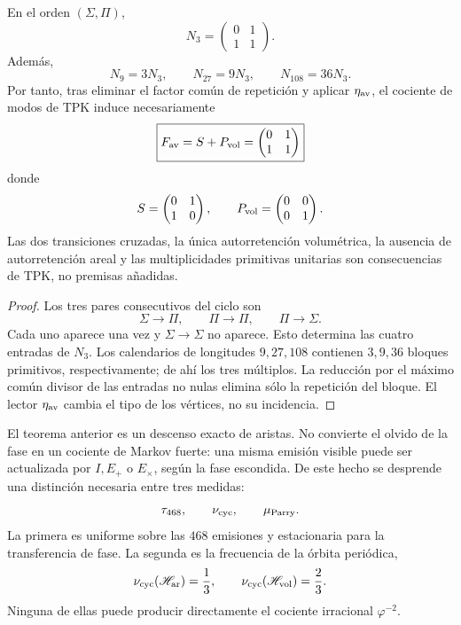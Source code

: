 \begin{theorem}
\label{p12-83-c16-s3:thm:descenso-necesario-fav-corta}
En el orden \((\Sigma,\Pi)\),
\[
 N_3=
 \begin{pmatrix}0&1\\1&1\end{pmatrix}.
\]
Además,
\[
 N_9=3N_3,\qquad
 N_{27}=9N_3,\qquad
 N_{108}=36N_3.
\]
Por tanto, tras eliminar el factor común de repetición y aplicar
\(\eta_{\rm av}\), el cociente de modos de TPK induce necesariamente
\[
 \boxed{
 F_{\rm av}=S+P_{\rm vol}
 =
 \begin{pmatrix}0&1\\1&1\end{pmatrix}
 }
\]
donde
\[
 S=\begin{pmatrix}0&1\\1&0\end{pmatrix},
 \qquad
 P_{\rm vol}=\begin{pmatrix}0&0\\0&1\end{pmatrix}.
\]
Las dos transiciones cruzadas, la única autorretención volumétrica, la
ausencia de autorretención areal y las multiplicidades primitivas unitarias
son consecuencias de TPK, no premisas añadidas.
\end{theorem}

\begin{proof}
Los tres pares consecutivos del ciclo son
\[
 \Sigma\longrightarrow\Pi,\qquad
 \Pi\longrightarrow\Pi,\qquad
 \Pi\longrightarrow\Sigma.
\]
Cada uno aparece una vez y \(\Sigma\to\Sigma\) no aparece. Esto determina
las cuatro entradas de \(N_3\). Los calendarios de longitudes
\(9,27,108\) contienen \(3,9,36\) bloques primitivos, respectivamente;
de ahí los tres múltiplos. La reducción por el máximo común divisor de las
entradas no nulas elimina sólo la repetición del bloque. El lector
\(\eta_{\rm av}\) cambia el tipo de los vértices, no su incidencia.
\end{proof}

El teorema anterior es un descenso exacto de aristas. No convierte el olvido
de la fase en un cociente de Markov fuerte: una misma emisión visible puede
ser actualizada por \(I,E_+\) o \(E_\times\), según la fase escondida. De
este hecho se desprende una distinción necesaria entre tres medidas:
\[
 \tau_{468},\qquad
 \nu_{\rm cyc},\qquad
 \mu_{\rm Parry}.
\]
La primera es uniforme sobre las \(468\) emisiones y estacionaria para la
transferencia de fase. La segunda es la frecuencia de la órbita periódica,
\[
 \nu_{\rm cyc}(\mathscr H_{\rm ar})=\frac13,\qquad
 \nu_{\rm cyc}(\mathscr H_{\rm vol})=\frac23.
\]
Ninguna de ellas puede producir directamente el cociente irracional
\(\varphi^{-2}\).

